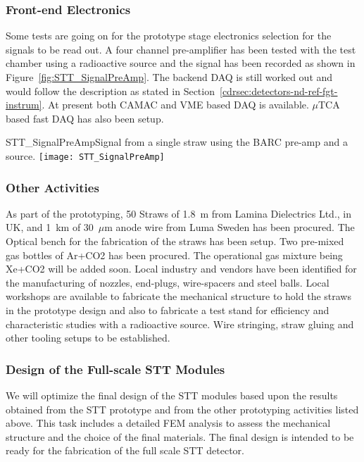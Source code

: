 \subsubsection{Front-end Electronics} 

Some tests are going on for the prototype stage electronics selection
for the signals to be read out.  A four channel pre-amplifier has been
tested with the test chamber using a radioactive source and the signal
has been recorded as shown in Figure~\ref{fig:STT_SignalPreAmp}.  The
backend DAQ is still worked out and would follow the description as
stated in Section~\ref{cdrsec:detectors-nd-ref-fgt-instrum}. At
present both CAMAC and VME based DAQ is available. $\mu$TCA based fast
DAQ has also been setup.
\begin{cdrfigure}  
{STT_SignalPreAmp}{Signal from a single straw using the BARC pre-amp and a source.}  
\texttt{[image: STT\_SignalPreAmp]}
\end{cdrfigure}


\subsubsection{Other Activities}

As part of the prototyping, 50 Straws of 1.8~m from Lamina
Dielectrics Ltd., in UK, and 1~km of 30~$\mu$m anode wire from Luma
Sweden has been procured. The Optical bench for the fabrication of the
straws has been setup.  Two pre-mixed gas bottles of Ar+CO2 has been
procured. The operational gas mixture being Xe+CO2 will be added
soon. Local industry and vendors have been identified for the
manufacturing of nozzles, end-plugs, wire-spacers and steel
balls. Local workshops are available to fabricate the mechanical
structure to hold the straws in the prototype design and also to
fabricate a test stand for efficiency and characteristic studies with
a radioactive source. Wire stringing, straw gluing and other tooling
setups to be established.


\subsubsection{Design of the Full-scale STT Modules} 
 
We will optimize the final design of the STT modules based upon the
results obtained from the STT prototype and from the other prototyping
activities listed above. This task includes a detailed FEM analysis to
assess the mechanical structure and the choice of the final
materials. The final design is intended to be ready for the
fabrication of the full scale STT detector.



